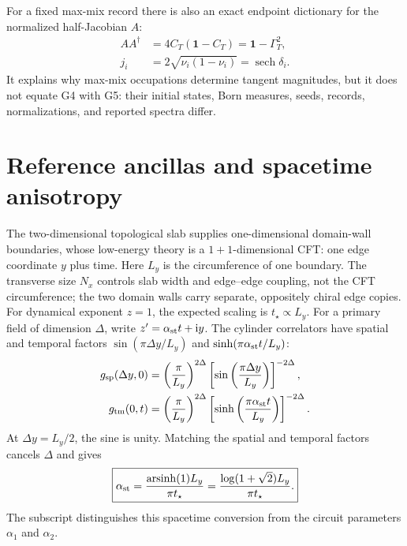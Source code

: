 \documentclass[aps,prx,twocolumn,superscriptaddress,longbibliography,nofootinbib,floatfix]{revtex4-2}
\newcommand{\Id}{\mathbf{1}}
\newcommand{\ii}{\mathrm{i}}
\begin{document}
For a fixed max-mix record there is also an exact endpoint dictionary for the normalized
half-Jacobian $A$:
\begin{align}
 AA^\dagger&=4C_T(\Id-C_T)=\Id-\Gamma_T^2,\nonumber\\
 j_i&=2\sqrt{\nu_i(1-\nu_i)}=\operatorname{sech}\delta_i.
 \label{eq:maxmix-dictionary}
\end{align}
It explains why max-mix occupations determine tangent magnitudes, but it does not equate
G4 with G5: their initial states, Born measures, seeds, records, normalizations, and
reported spectra differ.

\section{Reference ancillas and spacetime anisotropy}

The two-dimensional topological slab supplies one-dimensional domain-wall boundaries,
whose low-energy theory is a $1+1$-dimensional CFT: one edge coordinate $y$ plus time.
Here $L_y$ is the circumference of one boundary.  The transverse size $N_x$ controls
slab width and edge--edge coupling, not the CFT circumference; the two domain walls carry
separate, oppositely chiral edge copies.  For dynamical exponent $z=1$, the expected
scaling is $t_\star\propto L_y$.  For a primary field of dimension $\Delta$, write
$z'=\alpha_{\rm st}t+\ii y$.  The cylinder correlators have spatial and temporal factors
$\sin(\pi\Delta y/L_y)$ and $\sinh(\pi\alpha_{\rm st}t/L_y)$:
\begin{align}
 g_{\rm sp}(\Delta y,0)&=\left(\frac{\pi}{L_y}\right)^{2\Delta}
 \left[\sin\left(\frac{\pi\Delta y}{L_y}\right)\right]^{-2\Delta},
 \label{eq:g-space}\\
 g_{\rm tm}(0,t)&=\left(\frac{\pi}{L_y}\right)^{2\Delta}
 \left[\sinh\left(\frac{\pi\alpha_{\rm st}t}{L_y}\right)\right]^{-2\Delta}.
 \label{eq:g-time}
\end{align}
At $\Delta y=L_y/2$, the sine is unity.  Matching the spatial and temporal factors
cancels $\Delta$ and gives~\cite{Zabalo2022}
\begin{equation}
 \boxed{\alpha_{\rm st}
 =\frac{\operatorname{arsinh}(1)L_y}{\pi t_\star}
 =\frac{\log(1+\sqrt2)L_y}{\pi t_\star}.}
 \label{eq:alpha-st}
\end{equation}
The subscript distinguishes this spacetime conversion from the circuit parameters
$\alpha_1$ and $\alpha_2$.
\end{document}
